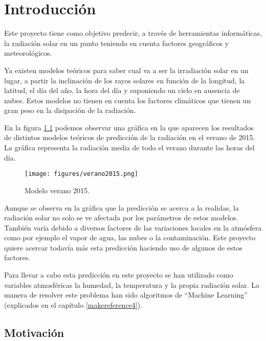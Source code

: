 \cleardoublepage

\chapter{Introducción}
\label{makereference}

Este proyecto tiene como objetivo predecir, a través de herramientas informáticas, la radiación solar en un punto teniendo en cuenta factores geográficos y meteorológicos.

Ya existen modelos teóricos para saber cual va a ser la irradiación solar en un lugar, a partir la inclinación de los rayos solares en función de la longitud, la latitud, el día del año, la hora del día y suponiendo un cielo en ausencia de nubes. Estos modelos no tienen en cuenta los factores climáticos que tienen un gran peso en la disipación de la radiación.

En la figura \ref{modelo_verano} podemos observar una gráfica en la que aparecen los resultados de distintos modelos teóricos de predicción de la radiación en el verano de 2015. La gráfica representa la radiación media de todo el verano durante las horas del día.

\begin{figure}[htb]
	\begin{center}
		\texttt{[image: figures/verano2015.png]}
		\caption{Modelo verano 2015. \label{modelo_verano}} 
	\end{center}
\end{figure}

Aunque se observa en la gráfica que la predicción se acerca a la realidas, la radiación solar no solo se ve afectada por los parámetros de estos modelos. También varía debido a diversos factores de las variaciones locales en la atmósfera como por ejemplo el vapor de agua, las nubes o la contaminación. Este proyecto quiere acercar todavía más esta predicción haciendo uso de algunos de estos factores.

Para llevar a cabo esta predicción en este proyecto se han utilizado como variables atmosféricas la humedad, la temperatura y la propia radiación solar. La manera de resolver este problema han sido algoritmos de ``Machine Learning'' (explicados en el capítulo \ref{makereference4}).

\section{Motivación}
\label{makereference1.1}

